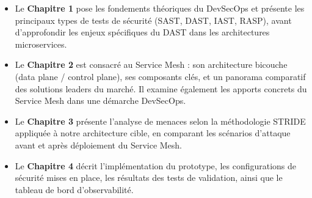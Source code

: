 \begin{itemize}
  \item Le \textbf{Chapitre 1} pose les fondements théoriques du DevSecOps et
    présente les principaux types de tests de sécurité (SAST, DAST, IAST, RASP),
    avant d'approfondir les enjeux spécifiques du DAST dans les architectures
    microservices.

  \item Le \textbf{Chapitre 2} est consacré au Service Mesh : son architecture
    bicouche (data plane / control plane), ses composants clés, et un panorama
    comparatif des solutions leaders du marché. Il examine également les apports
    concrets du Service Mesh dans une démarche DevSecOps.

  \item Le \textbf{Chapitre 3} présente l'analyse de menaces selon la méthodologie
    STRIDE appliquée à notre architecture cible, en comparant les scénarios
    d'attaque avant et après déploiement du Service Mesh.

  \item Le \textbf{Chapitre 4} décrit l'implémentation du prototype, les
    configurations de sécurité mises en place, les résultats des tests de
    validation, ainsi que le tableau de bord d'observabilité.
\end{itemize}

